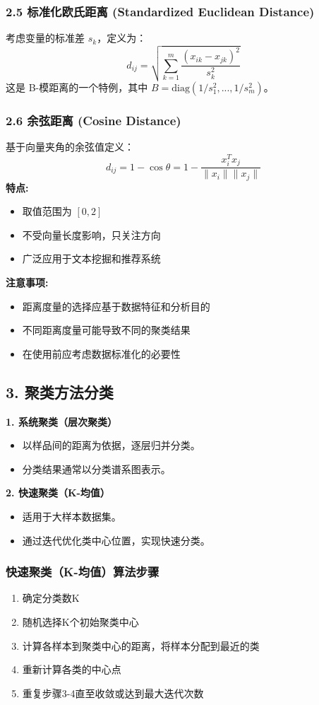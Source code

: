 \subsubsection{2.5 标准化欧氏距离 (Standardized Euclidean Distance)}
考虑变量的标准差 $s_k$，定义为：
\[
d_{ij} = \sqrt{\sum_{k=1}^m \frac{(x_{ik} - x_{jk})^2}{s_k^2}}
\]
这是 B-模距离的一个特例，其中 $B = \text{diag}(1/s_1^2, ..., 1/s_m^2)$。

\subsubsection{2.6 余弦距离 (Cosine Distance)}
基于向量夹角的余弦值定义：
\[
d_{ij} = 1 - \cos \theta = 1 - \frac{x_i^T x_j}{\|x_i\| \|x_j\|}
\]
\textbf{特点:}
\begin{itemize}
    \item 取值范围为 $[0,2]$
    \item 不受向量长度影响，只关注方向
    \item 广泛应用于文本挖掘和推荐系统
\end{itemize}

\textbf{注意事项:}
\begin{itemize}
    \item 距离度量的选择应基于数据特征和分析目的
    \item 不同距离度量可能导致不同的聚类结果
    \item 在使用前应考虑数据标准化的必要性
\end{itemize}



\subsection{3. 聚类方法分类}
\textbf{1. 系统聚类（层次聚类）}
\begin{itemize}
    \item 以样品间的距离为依据，逐层归并分类。
    \item 分类结果通常以分类谱系图表示。
\end{itemize}

\textbf{2. 快速聚类（K-均值）}
\begin{itemize}
    \item 适用于大样本数据集。
    \item 通过迭代优化类中心位置，实现快速分类。
\end{itemize}

\subsubsection{快速聚类（K-均值）算法步骤}
\begin{enumerate}
    \item 确定分类数K
    \item 随机选择K个初始聚类中心
    \item 计算各样本到聚类中心的距离，将样本分配到最近的类
    \item 重新计算各类的中心点
    \item 重复步骤3-4直至收敛或达到最大迭代次数
\end{enumerate}

